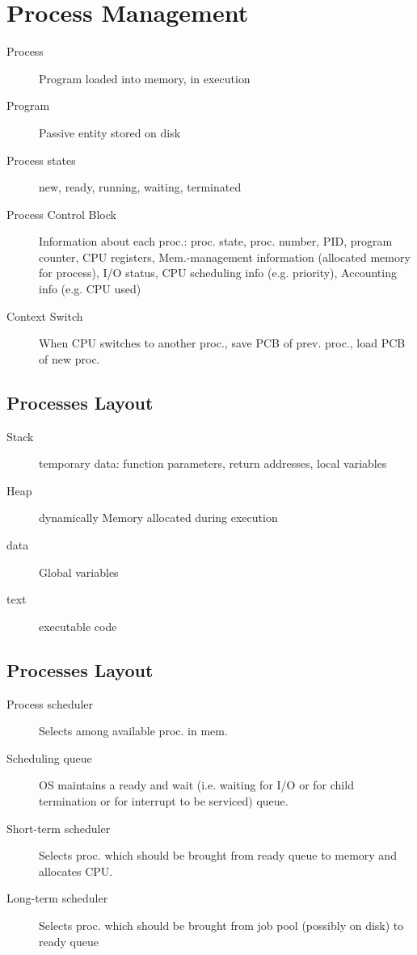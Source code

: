 \section*{Process Management}
\begin{description}
  \item[Process] Program loaded into memory, in execution
  \item[Program] Passive entity stored on disk
  \item[Process states] new, ready, running, waiting, terminated
  \item[Process Control Block] Information about each proc.: proc. state, proc. number, PID, program counter, CPU registers, Mem.-management information (allocated memory for process), I/O status, CPU scheduling info (e.g. priority), Accounting info (e.g. CPU used)
  \item[Context Switch] When CPU switches to another proc., save PCB of prev. proc., load PCB of new proc.
\end{description}

\subsection*{Processes Layout}
\begin{description}
  \item[Stack] temporary data: function parameters, return addresses, local variables
  \item[Heap] dynamically Memory allocated during execution
  \item[data] Global variables 
  \item[text] executable code
\end{description}

\subsection*{Processes Layout}
\begin{description}
  \item[Process scheduler] Selects among available proc. in mem.
  \item[Scheduling queue] OS maintains a ready and wait (i.e. waiting for I/O or for child termination or for interrupt to be serviced) queue.
  \item[Short-term scheduler] Selects proc. which should be brought from ready queue to memory and allocates CPU. 
  \item[Long-term scheduler] Selects proc. which should be brought from job pool (possibly on disk) to ready queue
\end{description}

